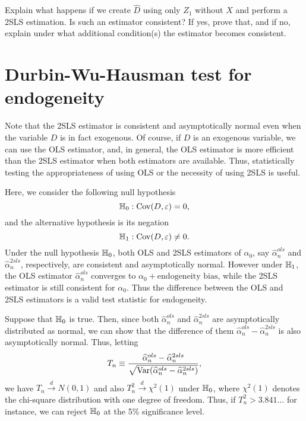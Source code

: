 \documentclass[11pt, A4paper, openany, uplatex]{book}
\begin{document}
\begin{framed}
\begin{exercise}\upshape
	Explain what happens if we create $\hat D$ using only $Z_1$ without $X$ and perform a 2SLS estimation.
	Is such an estimator consistent? If yes, prove that, and if no, explain under what additional condition(s) the estimator becomes consistent.
\end{exercise}
\end{framed}

\section{Durbin-Wu-Hausman test for endogeneity}

Note that the 2SLS estimator is consistent and asymptotically normal even when the variable $D$ is in fact exogenous. 
Of course, if $D$ is an exogenous variable, we can use the OLS estimator, and, in general, the OLS estimator is more efficient than the 2SLS estimator when both estimators are available.
Thus, statistically testing the appropriateness of using OLS or the necessity of using 2SLS is useful.

Here, we consider the following null hypothesis
\[
	\mathbb{H}_0: \mathrm{Cov}(D, \varepsilon) = 0,
\]
and the alternative hypothesis is its negation
\[
	\mathbb{H}_1: \mathrm{Cov}(D, \varepsilon) \neq 0.
\]
Under the null hypothesis $\mathbb{H}_0$, both OLS and 2SLS estimators of $\alpha_0$, say $\hat \alpha_n^{ols}$ and $\hat \alpha_n^{2sls}$, respectively,  are consistent and asymptotically normal.
However under $\mathbb{H}_1$, the OLS estimator $\hat \alpha_n^{ols}$ converges to $\alpha_0 + \text{endogeneity bias}$, while the 2SLS estimator is still consistent for $\alpha_0$.
Thus the difference between the OLS and 2SLS estimators is a valid test statistic for endogeneity. 

Suppose that $\mathbb{H}_0$ is true.
Then, since both $\hat \alpha_n^{ols}$ and $\hat \alpha_n^{2sls}$ are asymptotically distributed as normal, we can show that the difference of them $\hat \alpha_n^{ols} - \hat \alpha_n^{2sls}$ is also asymptotically normal.
Thus, letting 
\[
	T_n \equiv \frac{\widehat \alpha_n^{ols} - \widehat \alpha_n^{2sls}}{\sqrt{\mathrm{Var}(\widehat \alpha_n^{ols} - \widehat \alpha_n^{2sls})}},
\]	
we have $T_n \overset{d}{\to} N (0,1)$ and also $T_n^2 \overset{d}{\to} \chi^2(1)$ under $\mathbb{H}_0$, where $\chi^2(1)$ denotes the chi-square distribution with one degree of freedom.
Thus, if $T_n^2 > 3.841\ldots$ for instance, we can reject $\mathbb{H}_0$ at the 5\% significance level.
\end{document}
